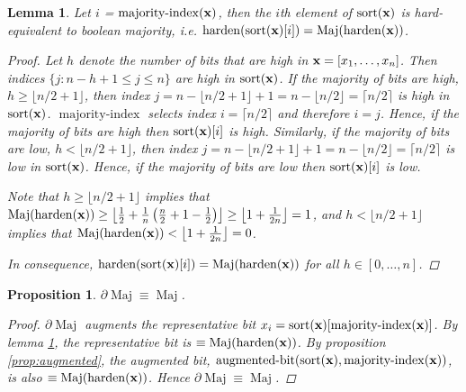 \documentclass{article} %
\newtheorem{prop}{Proposition}
\newtheorem{lemma}{Lemma}
\begin{document}
\begin{lemma}
\label{lem:maj}
Let $i$ = $\operatorname{majority-index}({\bf x})$, then the $i$th element of $\operatorname{sort}({\bf x})$ is hard-equivalent to boolean majority, i.e. $\operatorname{harden}(\operatorname{sort}({\bf x})[i]) = \operatorname{Maj}(\operatorname{harden}({\bf x}))$.
\begin{proof}
Let $h$ denote the number of bits that are high in ${\bf x} = [x_{1}, \dots, x_{n}]$. Then indices $\{j : n-h+1 \leq j \leq n\}$ are high in $\operatorname{sort}({\bf x})$. If the majority of bits are high, $h \geq \lfloor n/2 + 1 \rfloor$, then index $j=n - \lfloor n/2 + 1 \rfloor + 1 = n - \lfloor n/2 \rfloor = \lceil n/2 \rceil$ is high in $\operatorname{sort}({\bf x})$. $\operatorname{majority-index}$ selects index $i = \lceil n/2 \rceil$ and therefore $i=j$. Hence, if the majority of bits are high then $\operatorname{sort}({\bf x})[i]$ is high. Similarly, if the majority of bits are low, $h < \lfloor n/2 + 1 \rfloor$, then index $j=n - \lfloor n/2 + 1 \rfloor + 1 = n - \lfloor n/2 \rfloor = \lceil n/2 \rceil$ is low in $\operatorname{sort}({\bf x})$. Hence, if the majority of bits are low then $\operatorname{sort}({\bf x})[i]$ is low.

Note that $h \geq \lfloor n/2 + 1 \rfloor$ implies that $\operatorname{Maj}(\operatorname{harden}({\bf x})) \geq \left\lfloor \frac{1}{2} + \frac{1}{n}\left(\frac{n}{2} + 1 - \frac{1}{2} \right) \right\rfloor \geq \left\lfloor 1 + \frac{1}{2n} \right\rfloor = 1$, and $h < \lfloor n/2 + 1 \rfloor$ implies that $\operatorname{Maj}(\operatorname{harden}({\bf x})) < \left\lfloor 1 + \frac{1}{2n} \right\rfloor = 0$.

In consequence, $\operatorname{harden}(\operatorname{sort}({\bf x})[i]) = \operatorname{Maj}(\operatorname{harden}({\bf x}))$ for all $h \in [0,\dots, n]$.
\end{proof}
\end{lemma}

\begin{prop}\label{prop:majority}
	$\partial\!\operatorname{Maj} \equiv \operatorname{Maj}$.
\begin{proof}
	$\partial\!\operatorname{Maj}$ augments the representative bit $x_{i} = \operatorname{sort}({\bf x})[\operatorname{majority-index}({\bf x})]$. By lemma \ref{lem:maj}, the representative bit is $\equiv \operatorname{Maj}(\operatorname{harden}({\bf x}))$.
    By proposition \ref{prop:augmented}, the augmented bit, $\operatorname{augmented-bit}(\operatorname{sort}({\bf x}), \operatorname{majority-index}({\bf x}))$, is also $\equiv \operatorname{Maj}(\operatorname{harden}({\bf x}))$. Hence $\partial\!\operatorname{Maj} \equiv \operatorname{Maj}$.
\end{proof}
\end{prop}
\end{document}
